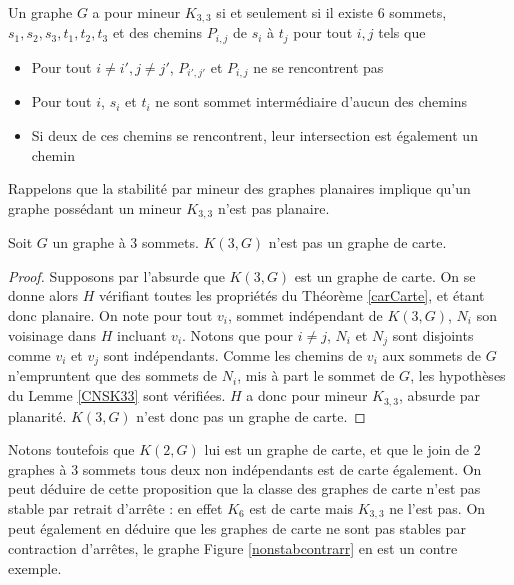 \documentclass{scrartcl}
\begin{document}
\begin{flushleft}
\begin{lem}\label{CNSK33}
    Un graphe $G$ a pour mineur $K_{3,3}$ si et seulement si il existe $6$ sommets, $s_1, s_2, s_3, t_1, t_2, t_3$ et des chemins
    $P_{i,j}$ de $s_i$ à $t_j$ pour tout $i, j$ tels que
    \begin{itemize}
        \item Pour tout $i \neq i', j \neq j'$, $P_{i',j'}$ et $P_{i, j}$ ne se rencontrent pas
        \item Pour tout $i$, $s_i$ et $t_i$ ne sont sommet intermédiaire d'aucun des chemins
        \item Si deux de ces chemins se rencontrent, leur intersection est également un chemin
    \end{itemize}
\end{lem}

Rappelons que la stabilité par mineur des graphes planaires implique qu'un graphe possédant un mineur $K_{3,3}$ n'est pas planaire.

\begin{prop}\label{K3G}
    Soit $G$ un graphe à $3$ sommets. $K(3, G)$ n'est pas un graphe de carte.
\end{prop}

\begin{proof}
    Supposons par l'absurde que $K(3, G)$ est un graphe de carte. On se donne alors $H$ vérifiant toutes les propriétés
    du Théorème \ref{carCarte}, et étant donc planaire. On note pour tout $v_i$, sommet indépendant de $K(3, G)$,
    $N_i$ son voisinage dans $H$ incluant $v_i$. Notons que pour $i \neq j$, $N_i$ et $N_j$ sont disjoints comme
    $v_i$ et $v_j$ sont indépendants. Comme les chemins de $v_i$ aux sommets de $G$ n'empruntent que des sommets de
    $N_i$, mis à part le sommet de $G$, les hypothèses du Lemme \ref{CNSK33} sont vérifiées. $H$ a donc pour mineur $K_{3,3}$,
    absurde par planarité. $K(3, G)$ n'est donc pas un graphe de carte.
\end{proof}

Notons toutefois que $K(2, G)$ lui est un graphe de carte, et que le join de $2$ graphes à $3$ sommets tous deux non indépendants
est de carte également. On peut déduire de cette proposition que la classe des graphes de carte n'est pas stable par retrait d'arrête :
en effet $K_6$ est de carte mais $K_{3,3}$ ne l'est pas. On peut également en déduire que les graphes de carte ne sont pas stables
par contraction d'arrêtes, le graphe Figure \ref{nonstabcontrarr} en est un contre exemple.


\end{flushleft}
\end{document}
